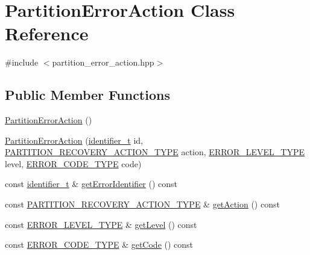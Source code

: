 \hypertarget{classPartitionErrorAction}{}\section{Partition\+Error\+Action Class Reference}
\label{classPartitionErrorAction}


{\ttfamily \#include $<$partition\+\_\+error\+\_\+action.\+hpp$>$}

\subsection*{Public Member Functions}
\begin{DoxyCompactItemize}
\item 
\hyperlink{classPartitionErrorAction_aa2dfc1a77eadabd19169b55cbf10e0fa}{Partition\+Error\+Action} ()
\item 
\hyperlink{classPartitionErrorAction_ace8c9468a22dbececdedec5697edb674}{Partition\+Error\+Action} (\hyperlink{general__types_8hpp_a824b78b06da8112c2772bc666a63638d}{identifier\+\_\+t} id, \hyperlink{apex__partition_8h_a5a8608b0eca151b6428695117c94a677}{P\+A\+R\+T\+I\+T\+I\+O\+N\+\_\+\+R\+E\+C\+O\+V\+E\+R\+Y\+\_\+\+A\+C\+T\+I\+O\+N\+\_\+\+T\+Y\+PE} action, \hyperlink{apex__error_8h_aa4da4218c0e2dcb8c37ea7a6cb5bd515}{E\+R\+R\+O\+R\+\_\+\+L\+E\+V\+E\+L\+\_\+\+T\+Y\+PE} level, \hyperlink{apex__error_8h_a6c3334fe6390cd6a2e88e6a4aab5ffcc}{E\+R\+R\+O\+R\+\_\+\+C\+O\+D\+E\+\_\+\+T\+Y\+PE} code)
\item 
const \hyperlink{general__types_8hpp_a824b78b06da8112c2772bc666a63638d}{identifier\+\_\+t} \& \hyperlink{classPartitionErrorAction_a3be53441a25240f8781bf2547ab103d0}{get\+Error\+Identifier} () const 
\item 
const \hyperlink{apex__partition_8h_a5a8608b0eca151b6428695117c94a677}{P\+A\+R\+T\+I\+T\+I\+O\+N\+\_\+\+R\+E\+C\+O\+V\+E\+R\+Y\+\_\+\+A\+C\+T\+I\+O\+N\+\_\+\+T\+Y\+PE} \& \hyperlink{classPartitionErrorAction_a6adf696b58a8d69f89e31aabcb3e649d}{get\+Action} () const 
\item 
const \hyperlink{apex__error_8h_aa4da4218c0e2dcb8c37ea7a6cb5bd515}{E\+R\+R\+O\+R\+\_\+\+L\+E\+V\+E\+L\+\_\+\+T\+Y\+PE} \& \hyperlink{classPartitionErrorAction_a4329d4f882f8a8ccf822265b697868de}{get\+Level} () const 
\item 
const \hyperlink{apex__error_8h_a6c3334fe6390cd6a2e88e6a4aab5ffcc}{E\+R\+R\+O\+R\+\_\+\+C\+O\+D\+E\+\_\+\+T\+Y\+PE} \& \hyperlink{classPartitionErrorAction_a5ec95aa4d2682d051e19d19fadd83b91}{get\+Code} () const 
\end{DoxyCompactItemize}


